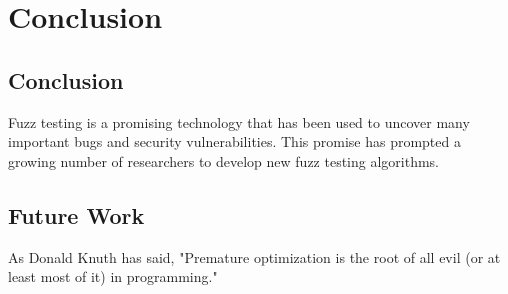 \chapter{Conclusion}
\label{sec:conclusion}
\minitoc
\vspace*{1cm}

\section{Conclusion}
Fuzz testing is a promising technology that has been used to uncover
many important bugs and security vulnerabilities. This promise
has prompted a growing number of researchers to develop new
fuzz testing algorithms. 
\section{Future Work}
As Donald Knuth has said, "Premature optimization is the root of all evil (or at least most of it) in programming."
